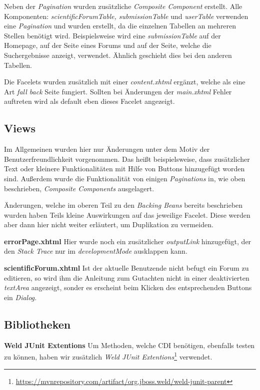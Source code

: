 Neben der \emph{Pagination} wurden zusätzliche \emph{Composite Component} erstellt. Alle Komponenten: \emph{scientificForumTable, submissionTable} und \emph{userTable} verwenden eine  \emph{Pagination} und wurden erstellt, da die einzelnen Tabellen an mehreren Stellen benötigt wird. Beispielsweise wird eine \emph{submissionTable} auf der Homepage, auf der Seite eines Forums und auf der Seite, welche die Suchergebnisse anzeigt, verwendet. Ähnlich geschieht dies bei den anderen Tabellen.

Die Facelets wurden zusätzlich mit einer \emph{content.xhtml} ergänzt, welche als eine Art \emph{fall back} Seite fungiert. Sollten  bei Änderungen der \emph{main.xhtml} Fehler auftreten wird als default eben dieses Facelet angezeigt.

\subsection{Views}

Im Allgemeinen wurden hier nur Änderungen unter dem Motiv der Benutzerfreundlichkeit vorgenommen. Das heißt beispielsweise, dass zusätzlicher Text oder kleinere Funktionalitäten mit Hilfe von Buttons hinzugefügt worden sind. Außerdem wurde die Funktionalität von einigen \emph{Paginations} in, wie oben beschrieben, \emph{Composite Components} ausgelagert.

Änderungen, welche im oberen Teil zu den \emph{Backing Beans} bereits beschrieben wurden haben Teils kleine Auswirkungen auf das jeweilige Facelet. Diese werden aber dann hier nicht weiter erläutert, um Duplikation zu vermeiden.

\textbf{errorPage.xhtml} Hier wurde noch ein zusätzlicher \emph{outputLink} hinzugefügt, der den \emph{Stack Trace} nur im \emph{developmentMode} ausklappen kann.

\textbf{scientificForum.xhtml} Ist der aktuelle Benutzende nicht befugt ein Forum zu editieren, so wird ihm die Anleitung zum Gutachten nicht in einer deaktivierten \emph{textArea} angezeigt, sonder es erscheint beim Klicken des entsprechenden Buttons ein \emph{Dialog.}

\subsection{Bibliotheken}

\textbf{Weld JUnit Extentions} Um Methoden, welche CDI benötigen, ebenfalls testen zu können, haben wir zusätzlich \emph{Weld JUnit Extentions}\footnote{\url{https://mvnrepository.com/artifact/org.jboss.weld/weld-junit-parent}} verwendet.


